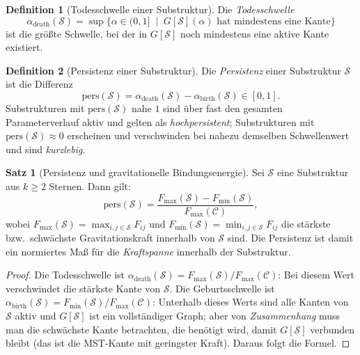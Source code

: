 ﻿\documentclass[a4paper,12pt]{report}
\theoremstyle{definition}
\newtheorem{definition}{Definition}
\newtheorem{satz}{Satz}
\begin{document}
\begin{definition}[Todesschwelle einer Substruktur]
\label{def:tod}
Die \emph{Todesschwelle}
\[
\alpha_\mathrm{death}(\mathcal{S}) = \sup\bigl\{\alpha \in (0,1] \;\mid\; G[\mathcal{S}](\alpha) \text{ hat mindestens eine Kante}\bigr\}
\]
ist die größte Schwelle, bei der in $G[\mathcal{S}]$ noch mindestens eine aktive Kante existiert.
\end{definition}

\begin{definition}[Persistenz einer Substruktur]
\label{def:persistenz}
Die \emph{Persistenz} einer Substruktur $\mathcal{S}$ ist die Differenz
\[
\mathrm{pers}(\mathcal{S}) = \alpha_\mathrm{death}(\mathcal{S}) - \alpha_\mathrm{birth}(\mathcal{S}) \in [0, 1].
\]
Substrukturen mit $\mathrm{pers}(\mathcal{S})$ nahe $1$ sind über fast den gesamten Parameterverlauf aktiv und gelten als \emph{hochpersistent}; Substrukturen mit $\mathrm{pers}(\mathcal{S}) \approx 0$ erscheinen und verschwinden bei nahezu demselben Schwellenwert und sind \emph{kurzlebig}.
\end{definition}

\begin{satz}[Persistenz und gravitationelle Bindungsenergie]
\label{satz:persistenz_energie}
Sei $\mathcal{S}$ eine Substruktur aus $k \geq 2$ Sternen. Dann gilt:
\[
\mathrm{pers}(\mathcal{S})
= \frac{F_\mathrm{max}(\mathcal{S}) - F_\mathrm{min}(\mathcal{S})}{F_\mathrm{max}(\mathcal{C})},
\]
wobei $F_\mathrm{max}(\mathcal{S}) = \max_{i,j \in \mathcal{S}} F_{ij}$ und $F_\mathrm{min}(\mathcal{S}) = \min_{i,j \in \mathcal{S}} F_{ij}$ die stärkste bzw.\ schwächste Gravitationskraft innerhalb von $\mathcal{S}$ sind. Die Persistenz ist damit ein normiertes Maß für die \emph{Kraftspanne} innerhalb der Substruktur.
\end{satz}

\begin{proof}
Die Todesschwelle ist $\alpha_\mathrm{death}(\mathcal{S}) = F_\mathrm{max}(\mathcal{S})/F_\mathrm{max}(\mathcal{C})$: Bei diesem Wert verschwindet die stärkste Kante von $\mathcal{S}$. Die Geburtsschwelle ist $\alpha_\mathrm{birth}(\mathcal{S}) = F_\mathrm{min}(\mathcal{S})/F_\mathrm{max}(\mathcal{C})$: Unterhalb dieses Werts sind alle Kanten von $\mathcal{S}$ aktiv und $G[\mathcal{S}]$ ist ein vollständiger Graph; aber von \emph{Zusammenhang} muss man die schwächste Kante betrachten, die benötigt wird, damit $G[\mathcal{S}]$ verbunden bleibt (das ist die MST-Kante mit geringster Kraft). Daraus folgt die Formel.
\end{proof}
\end{document}
